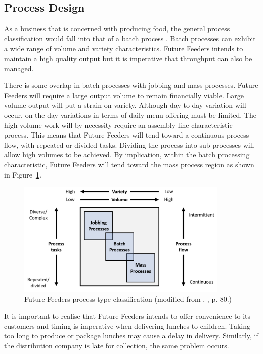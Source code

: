 \subsection{Process Design}
\label{sec:ops2}
As a business that is concerned with producing food, the general process classification would fall into that of a batch process \cite[pp. 74-96]{ops_book}. Batch processes can exhibit a wide range of volume and variety characteristics. Future Feeders intends to maintain a high quality output but it is imperative that throughput can also be managed.

There is some overlap in batch processes with jobbing and mass processes. Future Feeders will require a large output volume to remain financially viable. Large volume output will put a strain on variety. Although day-to-day variation will occur, on the day variations in terms of daily menu offering must be limited. The high volume work will by necessity require an assembly line characteristic process. This means that Future Feeders will tend toward a continuous process flow, with repeated or divided tasks. Dividing the process into sub-processes will allow high volumes to be achieved. By implication, within the batch processing characteristic, Future Feeders will tend toward the mass process region as shown in Figure~\ref{fig:op_design}.

\begin{figure}[H]
    \centering
    \includegraphics[width=0.9\textwidth]{op_design.png}
    \caption{Future Feeders process type classification (modified from \protect\citeauthor{ops_book}, \protect\citeyear{ops_book}, p. 80.)}
    \label{fig:op_design}
\end{figure}

It is important to realise that Future Feeders intends to offer convenience to its customers and timing is imperative when delivering lunches to children. Taking too long to produce or package lunches may cause a delay in delivery. Similarly, if the distribution company is late for collection, the same problem occurs.

